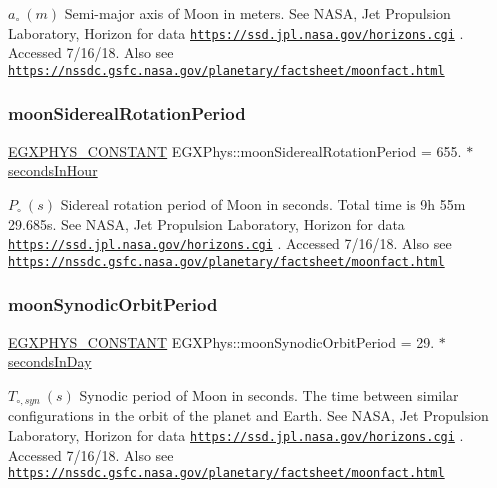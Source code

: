 $ a_{\circ} \ (m)$ Semi-\/major axis of Moon in meters. See N\+A\+SA, Jet Propulsion Laboratory, Horizon for data \href{https://ssd.jpl.nasa.gov/horizons.cgi}{\tt https\+://ssd.\+jpl.\+nasa.\+gov/horizons.\+cgi} . Accessed 7/16/18. Also see \href{https://nssdc.gsfc.nasa.gov/planetary/factsheet/moonfact.html}{\tt https\+://nssdc.\+gsfc.\+nasa.\+gov/planetary/factsheet/moonfact.\+html} \mbox{\label{group___e_g_x_phys-_constants-_astrophysics-_solar_system-_moon-_orbit_ga321f508eb0704d929b090dac0a892682}} 
\subsubsection{\texorpdfstring{moon\+Sidereal\+Rotation\+Period}{moonSiderealRotationPeriod}}
{\footnotesize\ttfamily \mbox{\hyperlink{group___e_g_x_phys-_constants-_macros_ga76980d288494ce1714c9ac68a95ba702}{E\+G\+X\+P\+H\+Y\+S\+\_\+\+C\+O\+N\+S\+T\+A\+NT}} E\+G\+X\+Phys\+::moon\+Sidereal\+Rotation\+Period = 655. $\ast$ \mbox{\hyperlink{namespace_e_g_x_phys_a7c3165cd93e36f1fb8e9fef80f117bef}{seconds\+In\+Hour}}}

$ P_{\circ} \ (s)$ Sidereal rotation period of Moon in seconds. Total time is 9h 55m 29.\+685s. See N\+A\+SA, Jet Propulsion Laboratory, Horizon for data \href{https://ssd.jpl.nasa.gov/horizons.cgi}{\tt https\+://ssd.\+jpl.\+nasa.\+gov/horizons.\+cgi} . Accessed 7/16/18. Also see \href{https://nssdc.gsfc.nasa.gov/planetary/factsheet/moonfact.html}{\tt https\+://nssdc.\+gsfc.\+nasa.\+gov/planetary/factsheet/moonfact.\+html} \mbox{\label{group___e_g_x_phys-_constants-_astrophysics-_solar_system-_moon-_orbit_ga2748ff6079aec4fd22f47b1534005b80}} 
\subsubsection{\texorpdfstring{moon\+Synodic\+Orbit\+Period}{moonSynodicOrbitPeriod}}
{\footnotesize\ttfamily \mbox{\hyperlink{group___e_g_x_phys-_constants-_macros_ga76980d288494ce1714c9ac68a95ba702}{E\+G\+X\+P\+H\+Y\+S\+\_\+\+C\+O\+N\+S\+T\+A\+NT}} E\+G\+X\+Phys\+::moon\+Synodic\+Orbit\+Period = 29. $\ast$ \mbox{\hyperlink{namespace_e_g_x_phys_a93d2a00d75411b58cbf63ab3fd1f8bc2}{seconds\+In\+Day}}}

$ T_{\circ,syn} \ (s)$ Synodic period of Moon in seconds. The time between similar configurations in the orbit of the planet and Earth. See N\+A\+SA, Jet Propulsion Laboratory, Horizon for data \href{https://ssd.jpl.nasa.gov/horizons.cgi}{\tt https\+://ssd.\+jpl.\+nasa.\+gov/horizons.\+cgi} . Accessed 7/16/18. Also see \href{https://nssdc.gsfc.nasa.gov/planetary/factsheet/moonfact.html}{\tt https\+://nssdc.\+gsfc.\+nasa.\+gov/planetary/factsheet/moonfact.\+html} 